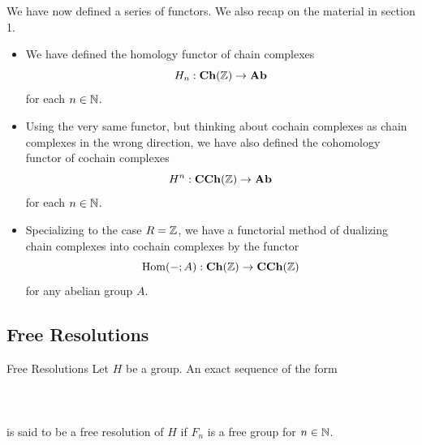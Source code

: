 \documentclass[a4paper]{article}
\begin{document}
We have now defined a series of functors. We also recap on the material in section 1. 
\begin{itemize}
\item We have defined the homology functor of chain complexes $$H_n:\bold{Ch}(\mathbb{Z})\to\bold{Ab}$$ for each $n\in\mathbb{N}$. 
\item Using the very same functor, but thinking about cochain complexes as chain complexes in the wrong direction, we have also defined the cohomology functor of cochain complexes $$H^n:\bold{CCh}(\mathbb{Z})\to\bold{Ab}$$ for each $n\in\mathbb{N}$. 
\item Specializing to the case $R=\mathbb{Z}$, we have a functorial method of dualizing chain complexes into cochain complexes by the functor $$\operatorname{Hom}(-;A):\bold{Ch}(\mathbb{Z})\to\bold{CCh}(\mathbb{Z})$$ for any abelian group $A$. 
\end{itemize}

\subsection{Free Resolutions}
\begin{defn}{Free Resolutions}{} Let $H$ be a group. An exact sequence of the form \\~\\
\\~\\
is said to be a free resolution of $H$ if $F_n$ is a free group for $n\in\mathbb{N}$. 
\end{defn}
\end{document}
